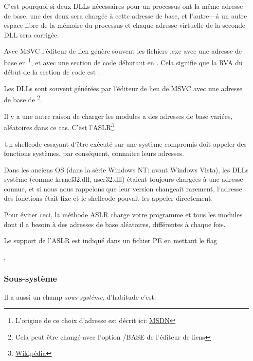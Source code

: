 C'est pourquoi si deux DLLs nécessaires pour un processus ont la même adresse de base,
une des deux sera chargée à cette adresse de base, et l'autre---à un autre espace
libre de la mémoire du processus et chaque adresse virtuelle de la seconde DLL sera
corrigée.

\par Avec \ac{MSVC} l'éditeur de lien génère souvent les fichiers .exe avec une adresse
de base en \footnote{L'origine de ce choix d'adresse est décrit ici:
\href{http://go.yurichev.com/17041}{MSDN}}, et avec une section de code débutant
en .
Cela signifie que la \ac{RVA} du début de la section de code est .

Les DLLs sont souvent générées par l'éditeur de lien de MSVC avec une adresse de
base de \footnote{Cela peut être changé avec l'option /BASE de l'éditeur
de liens}.


Il y a une autre raison de charger les modules a des adresses de base variées, aléatoires
dans ce cas. C'est l'\ac{ASLR}\footnote{\href{http://go.yurichev.com/17140}{Wikipédia}}.


Un shellcode essayant d'être exécuté sur une système compromis doit appeler des fonctions
systèmes, par conséquent, connaitre leurs adresses.

Dans les anciens \ac{OS} (dans la série \gls{Windows NT}: avant Windows Vista), les
DLLs système (comme kernel32.dll, user32.dll) étaient toujours chargées à une adresse
connue, et si nous nous rappelons que leur version changeait rarement, l'adresse
des fonctions était fixe et le shellcode pouvait les appeler directement.

Pour éviter ceci, la méthode \ac{ASLR} charge votre programme et tous les modules
dont il a besoin à des adresses de base aléatoires, différentes à chaque fois.

Le support de l'\ac{ASLR} est indiqué dans un fichier PE en mettant le flag
\par {} .

\subsubsection{Sous-système}

Il a aussi un champ \emph{sous-système}, d'habitude c'est:

